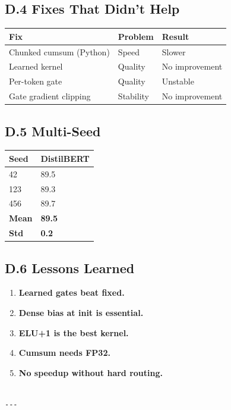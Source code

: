 \subsection{D.4 Fixes That Didn't Help}

\begin{table}[H]
\centering
\small
\begin{tabular}{lll}
\toprule
\textbf{Fix} & \textbf{Problem} & \textbf{Result} \\
\midrule
Chunked cumsum (Python) & Speed & Slower \\
Learned kernel & Quality & No improvement \\
Per-token gate & Quality & Unstable \\
Gate gradient clipping & Stability & No improvement \\
\bottomrule
\end{tabular}
\end{table}

\subsection{D.5 Multi-Seed}

\begin{table}[H]
\centering
\small
\begin{tabular}{ll}
\toprule
\textbf{Seed} & \textbf{DistilBERT} \\
\midrule
42 & 89.5 \\
123 & 89.3 \\
456 & 89.7 \\
\textbf{Mean} & \textbf{89.5} \\
\textbf{Std} & \textbf{0.2} \\
\bottomrule
\end{tabular}
\end{table}

\subsection{D.6 Lessons Learned}

\begin{enumerate}
\item \textbf{Learned gates beat fixed.}
\item \textbf{Dense bias at init is essential.}
\item \textbf{ELU+1 is the best kernel.}
\item \textbf{Cumsum needs FP32.}
\item \textbf{No speedup without hard routing.}
\end{enumerate}
\begin{lstlisting}

---
\end{lstlisting}